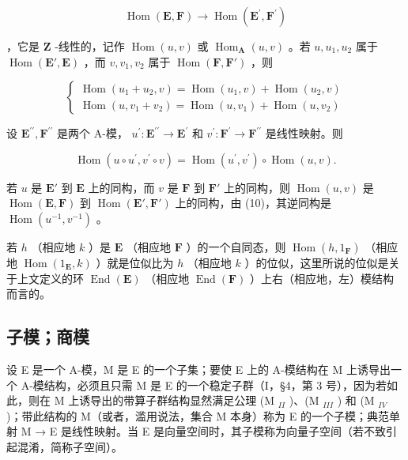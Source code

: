 \[
\operatorname{Hom} (\mathbf {E}, \mathbf {F}) \rightarrow \operatorname{Hom} (\mathbf {E} ^ {\prime}, \mathbf {F} ^ {\prime})
\]

，它是 \(\mathbf{Z}\) -线性的，记作 \(\operatorname{Hom}(u,v)\) 或 \(\operatorname{Hom}_{\mathbf{A}}(u,v)\) 。若 \(u, u_1, u_2\) 属于 \(\operatorname{Hom}(\mathbf{E}', \mathbf{E})\) ，而 \(v, v_1, v_2\) 属于 \(\operatorname{Hom}(\mathbf{F}, \mathbf{F}')\) ，则

\[
\left\{ \begin{array}{l} \operatorname{Hom} (u _ {1} + u _ {2}, v) = \operatorname{Hom} (u _ {1}, v) + \operatorname{Hom} (u _ {2}, v) \\ \operatorname{Hom} (u, v _ {1} + v _ {2}) = \operatorname{Hom} (u, v _ {1}) + \operatorname{Hom} (u, v _ {2}) \end{array} \right.\tag{9}
\]

设 \(\mathbf{E}^{\prime \prime},\mathbf{F}^{\prime \prime}\) 是两个 A-模， \(u^{\prime}:\mathbf{E}^{\prime \prime}\to \mathbf{E}^{\prime}\) 和 \(v^{\prime}:\mathbf{F}^{\prime}\rightarrow \mathbf{F}^{\prime \prime}\) 是线性映射。则

\[
\operatorname{Hom} \left(u \circ u ^ {\prime}, v ^ {\prime} \circ v\right) = \operatorname{Hom} \left(u ^ {\prime}, v ^ {\prime}\right) \circ \operatorname{Hom} (u, v).\tag{10}
\]

若 \(u\) 是 \(\mathbf{E}'\) 到 \(\mathbf{E}\) 上的同构，而 \(v\) 是 \(\mathbf{F}\) 到 \(\mathbf{F}'\) 上的同构，则 \(\operatorname{Hom}(u, v)\) 是 \(\operatorname{Hom}(\mathbf{E}, \mathbf{F})\) 到 \(\operatorname{Hom}(\mathbf{E}', \mathbf{F}')\) 上的同构，由 (10)，其逆同构是 \(\operatorname{Hom}(u^{-1}, v^{-1})\) 。

若 \(h\) （相应地 \(k\) ）是 \(\mathbf{E}\) （相应地 \(\mathbf{F}\) ）的一个自同态，则 \(\operatorname{Hom}(h, 1_{\mathbf{F}})\) （相应地 \(\operatorname{Hom}(1_{\mathbf{E}}, k)\) ）就是位似比为 \(h\) （相应地 \(k\) ）的位似，这里所说的位似是关于上文定义的环 \(\operatorname{End}(\mathbf{E})\) （相应地 \(\operatorname{End}(\mathbf{F})\) ）上右（相应地，左）模结构而言的。

\subsection{子模；商模}

设 E 是一个 A-模，M 是 E 的一个子集；要使 E 上的 A-模结构在 M 上诱导出一个 A-模结构，必须且只需 M 是 E 的一个稳定子群（I，§4，第 3 号），因为若如此，则在 M 上诱导出的带算子群结构显然满足公理 (M \(_{II}\) )、(M \(_{III}\) ) 和 (M \(_{IV}\) )；带此结构的 M（或者，滥用说法，集合 M 本身）称为 E 的一个子模；典范单射 M → E 是线性映射。当 E 是向量空间时，其子模称为向量子空间（若不致引起混淆，简称子空间）。

